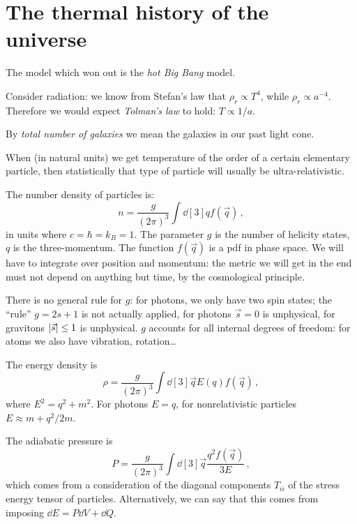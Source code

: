 \documentclass[main.tex]{subfiles}
\begin{document}
\chapter{The thermal history of the universe}

The model which won out is the \emph{hot Big Bang} model.

Consider radiation: we know from Stefan's law that \(\rho _r \propto T^{4}\), while \(\rho _r \propto a^{-4}\). Therefore we would expect \emph{Tolman's law} to hold: \(T \propto 1/a\).

By \emph{total number of galaxies} we mean the galaxies in our past light cone.

When (in natural units) we get temperature of the order of a certain elementary particle, then statistically that type of particle will usually be ultra-relativistic.

The number density of particles is: 
%
\begin{equation}
  n = \frac{g}{(2 \pi )^3} \int \dd[3]{q} f(\vec{q})
\,,
\end{equation}
%
in units where \(c= \hbar = k_B = 1\). The parameter \(g\) is the number of helicity states, \(q\) is the three-momentum. The function \(f(\vec{q})\) is a pdf in phase space.
We will have to integrate  over position and momentum: the metric we will get in the end must not depend on anything but time, by the cosmological principle.

There is no general rule for \(g\): for photons, we only have two spin states; the ``rule'' \(g = 2s +1 \) is not actually applied, for photons \(\vec{s} = 0\) is unphysical, for gravitons \(\abs{\vec{s}} \leq 1 \) is unphysical.
\(g\) accounts for all internal degrees of freedom: for atoms we also have vibration, rotation\dots

The energy density is 
%
\begin{equation}
  \rho = \frac{g}{(2 \pi )^3} \int \dd[3]{\vec{q}} E(q) f(\vec{q}) 
\,,
\end{equation}
%
where \(E^2 = q^2 + m^2\). For photons \(E = q\), for nonrelativistic particles \(E \approx m + q^2 / 2m\).

The adiabatic pressure is 
%
\begin{equation}
  P = \frac{g}{(2 \pi )^3} \int \dd[3]{\vec{q}} \frac{q^2 f(\vec{q})}{3E} 
\,,
\end{equation}
%
which comes from a consideration of the diagonal components \(T_{ii}\) of the stress energy tensor of particles. Alternatively, we can say that this comes from imposing \(\dd{E} = P \dd{V} + \dd{Q} \).
\end{document}
